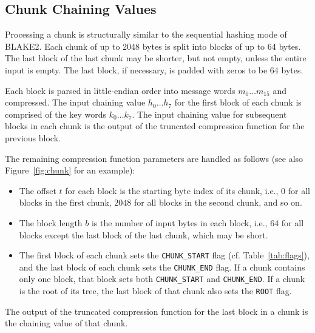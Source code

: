 \documentclass[11pt,notitlepage,a4paper]{article}
\begin{document}
\subsection{Chunk Chaining Values}\label{sec:chunk}

Processing a chunk is structurally similar to the sequential hashing mode of BLAKE2. Each chunk of up to 2048 bytes is split into blocks of up to 64 bytes.
The last block of the last chunk may be shorter, but not empty, unless the
entire input is empty. The last block, if necessary, is padded with zeros to be 64
bytes. 

Each block is parsed in little-endian order into message words $m_{0}
\ldots m_{15}$ and compressed. The input chaining value $h_{0} \ldots h_{7}$
for the first block of each chunk is comprised of the key words $k_{0} \ldots k_{7}$. The
input chaining value for subsequent blocks in each chunk is the output of the truncated
compression function for the previous block. 

The remaining compression function parameters are handled as follows (see also Figure~\ref{fig:chunk} for an example):
\begin{itemize}
\item The offset $t$ for each block is
the starting byte index of its chunk, i.e., $0$ for all blocks in the first chunk, $2048$
for all blocks in the second chunk, and so on. 
\item The block length $b$ is the
number of input bytes in each block, i.e., $64$ for all blocks except the last block of
the last chunk, which may be short. 
\item The first block of each chunk sets the
\texttt{CHUNK\_START} flag (cf. Table~\ref{tab:flags}), and the last block of each chunk sets the
\texttt{CHUNK\_END} flag. If a chunk contains only one block, that block sets
both \texttt{CHUNK\_START} and \texttt{CHUNK\_END}. If a chunk is the root of
its tree, the last block of that chunk also sets the \texttt{ROOT} flag.
\end{itemize}

The output of the truncated compression function for the last block in a chunk
is the chaining value of that chunk.
\end{document}
